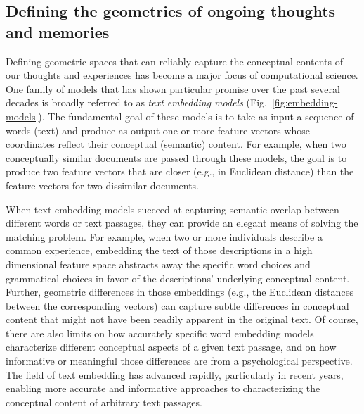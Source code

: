 \documentclass{article}
\begin{document}
\subsection*{Defining the geometries of ongoing thoughts and memories}
Defining geometric spaces that can reliably capture the conceptual contents of our thoughts and experiences has become a major focus of computational science.  One family of models that has shown particular promise over the past several decades is broadly referred to as \textit{text embedding models} (Fig.~\ref{fig:embedding-models}).  The fundamental goal of these models is to take as input a sequence of words (text) and produce as output one or more feature vectors whose coordinates reflect their conceptual (semantic) content.  For example, when two conceptually similar documents are passed through these models, the goal is to produce two feature vectors that are closer (e.g., in Euclidean distance) than the feature vectors for two dissimilar documents.

When text embedding models succeed at capturing semantic overlap between different words or text passages, they can provide an elegant means of solving the matching problem.  For example, when two or more individuals describe a common experience, embedding the text of those descriptions in a high dimensional feature space abstracts away the specific word choices and grammatical choices in favor of the descriptions' underlying conceptual content.  Further, geometric differences in those embeddings (e.g., the Euclidean distances between the corresponding vectors) can capture subtle differences in conceptual content that might not have been readily apparent in the original text.  Of course, there are also limits on how accurately specific word embedding models characterize different conceptual aspects of a given text passage, and on how informative or meaningful those differences are from a psychological perspective.  The field of text embedding has advanced rapidly, particularly in recent years, enabling more accurate and informative approaches to characterizing the conceptual content of arbitrary text passages.
\end{document}
